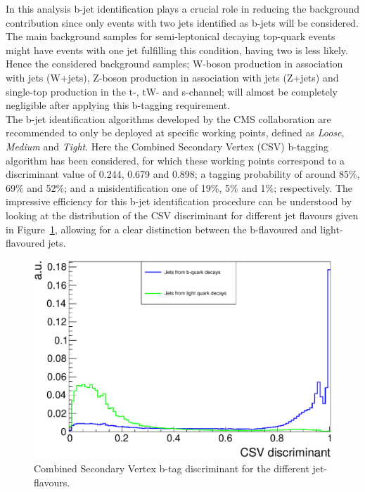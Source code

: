 In this analysis b-jet identification plays a crucial role in reducing the background contribution since only events with two jets identified as b-jets will be considered. The main background samples for semi-leptonical decaying top-quark events might have events with one jet fulfilling this condition, having two  is less likely. %
Hence the considered background samples; W-boson production in association with jets (W+jets), Z-boson production in association with jets (Z+jets) and single-top production in the t-, tW- and s-channel; will almost be completely negligible after applying this b-tagging requirement.
\\

The b-jet identification algorithms developed by the CMS collaboration are recommended to only be deployed at specific working points, defined as \textit{Loose}, \textit{Medium} and \textit{Tight}. 
Here the Combined Secondary Vertex (CSV) b-tagging algorithm has been considered, for which these working points correspond to a discriminant value of 0.244, 0.679 and 0.898; a tagging probability of around 85$\%$, 69$\%$ and 52$\%$; and a misidentification one of 19$\%$, 5$\%$ and 1$\%$; respectively.
The impressive efficiency for this b-jet identification procedure can be understood by looking at the distribution of the CSV discriminant for different jet flavours given in Figure~\ref{fig::CSVDiscr}, allowing for a clear distinction between the b-flavoured and light-flavoured jets.
\begin{figure}[h!t]
 \centering
 \includegraphics[width = 0.75 \textwidth]{Chapters/Chapter4_EvtSel/Figures/CSVDiscr_LightAndBJets.pdf}
 \caption{Combined Secondary Vertex b-tag discriminant for the different jet-flavours.} \label{fig::CSVDiscr}
\end{figure}

